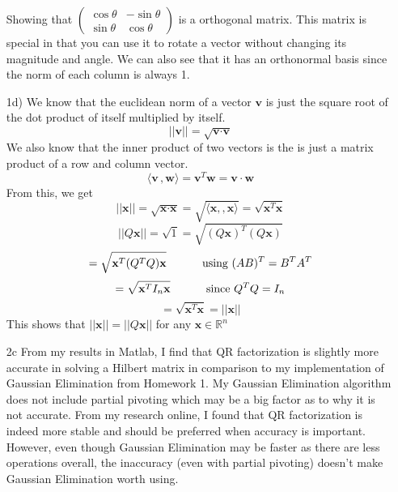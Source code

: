 \documentclass{article}
\begin{document}
\begin{enumerate}
    Showing that $\begin{pmatrix}
        \cos\theta & -\sin\theta \\
        \sin\theta & \cos\theta
        \end{pmatrix}$
    is a orthogonal matrix.
    This matrix is special in that you can use it to rotate a vector without changing its magnitude and angle. We can also see that it has an orthonormal basis since the norm of each column is always 1.
    
    \item[1d)] We know that the euclidean norm of a vector $\textbf{v}$ is just the square root of the dot product of itself multiplied by itself.
    $$||\textbf{v}|| = \sqrt{\textbf{v} \cdot \textbf{v}}$$
    We also know that the inner product of two vectors is the is just a matrix product of a row and column vector.
    $$\langle\textbf{v}\,,\textbf{w}\rangle = \textbf{v}^T\textbf{w} = \textbf{v} \cdot \textbf{w} $$
    From this, we get
    $$||\textbf{x}|| = \sqrt{\textbf{x} \cdot \textbf{x}} = \sqrt{\langle\textbf{x},,\textbf{x}\rangle} = \sqrt{\textbf{x}^T\textbf{x}}$$
    $$||Q\textbf{x}|| = \sqrt{1} = \sqrt{(Q\textbf{x})^T(Q\textbf{x})}$$
    $$= \sqrt{\textbf{x}^T(Q^TQ)\textbf{x}}\text{\hspace{10mm} using $(AB)^T = B^TA^T$}$$
    $$= \sqrt{\textbf{x}^TI_n\textbf{x}}\text{\hspace{10mm} since $Q^TQ = I_n$}$$  
    $$= \sqrt{\textbf{x}^T\textbf{x}} = ||\textbf{x}||$$
    This shows that $||\textbf{x}|| = ||Q\textbf{x}||$ for any $\textbf{x} \in \mathbb{R}^n$
        
    \item[2c]
    From my results in Matlab, I find that QR factorization is slightly more accurate in solving a Hilbert matrix in comparison to my implementation of Gaussian Elimination from Homework 1. My Gaussian Elimination algorithm does not include partial pivoting which may be a big factor as to why it is not accurate. From my research online, I found that QR factorization is indeed more stable and should be preferred when accuracy is important. However, even though Gaussian Elimination may be faster as there are less operations overall, the inaccuracy (even with partial pivoting) doesn't make Gaussian Elimination worth using.
\end{enumerate}
\end{document}
